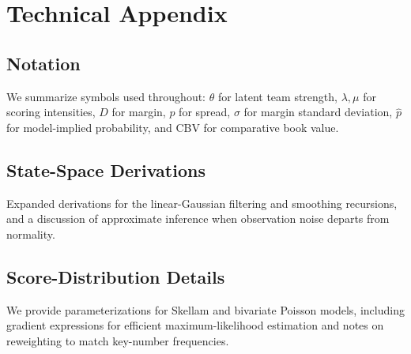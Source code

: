\documentclass[12pt]{report}  %
\numberwithin{equation}{section}
\theoremstyle{plain}
\theoremstyle{definition}
\theoremstyle{remark}
\begin{document}














\appendix
\makeatletter
\renewcommand\thechapter{\AlphAlph{\value{chapter}}}
\makeatother
\chapter{Technical Appendix}
\section{Notation}
We summarize symbols used throughout: $\theta$ for latent team strength, $\lambda,\mu$ for scoring intensities, $D$ for margin, $p$ for spread, $\sigma$ for margin standard deviation, $\hat p$ for model-implied probability, and CBV for comparative book value.

\section{State-Space Derivations}
Expanded derivations for the linear-Gaussian filtering and smoothing recursions, and a discussion of approximate inference when observation noise departs from normality.

\section{Score-Distribution Details}
We provide parameterizations for Skellam and bivariate Poisson models, including gradient expressions for efficient maximum-likelihood estimation and notes on reweighting to match key-number frequencies.
\end{document}

